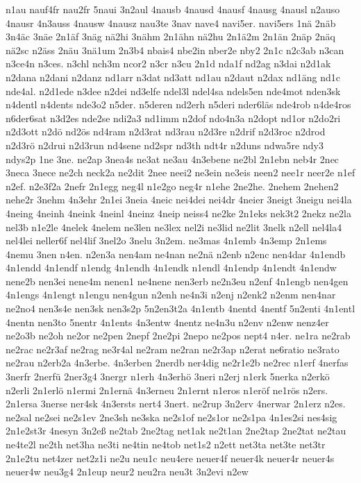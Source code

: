 {n1au
nauf4fr
nau2fr
5naui
3n2aul
4nausb
4nausd
4nausf
4nausg
4nausl
n2auso
4nausr
4n3auss
4nausw
4nausz
nau3te
3nav
nave4
navi5er.
navi5ers
1nä
2näb
3n4äc
3näe
2n1äf
3näg
nä2hi
3nähm
2n1ähn
nä2hu
2n1ä2m
2n1än
2näp
2näq
nä2sc
n2äss
2näu
3nä1um
2n3b4
nbais4
nbe2in
nber2e
nby2
2n1c
n2c3ab
n3can
n3ce4n
n3ces.
n3chl
nch3m
ncor2
n3cr
n3cu
2n1d
nda1f
nd2ag
n3dai
n2d1ak
n2dana
n2dani
n2danz
nd1arr
n3dat
nd3att
nd1au
n2daut
n2dax
nd1äng
nd1c
nde4al.
n2d1ede
n3dee
n2dei
nd3elfe
ndel3l
ndel4sa
ndels5en
nde4mot
nden3sk
n4dentl
n4dents
nde3o2
n5der.
n5deren
nd2erh
n5deri
nder6läs
nde4rob
n4de4ros
n6der6sat
n3d2es
nde2se
ndi2a3
nd1imm
n2dof
ndo4n3a
n2dopt
nd1or
n2do2ri
n2d3ott
n2dö
nd2ös
nd4ram
n2d3rat
nd3rau
n2d3re
n2drif
n2d3roc
n2drod
n2d3rö
n2drui
n2d3run
nd4sene
nd2spr
nd3th
ndt4r
n2duns
ndwa5re
ndy3
ndys2p
1ne
3ne.
ne2ap
3nea4s
ne3at
ne3au
4n3ebene
ne2bl
2n1ebn
neb4r
2nec
3neca
3nece
ne2ch
neck2a
ne2dit
2nee
neei2
ne3ein
ne3eis
neen2
nee1r
neer2e
n1ef
n2ef.
n2e3f2a
2nefr
2n1egg
neg4l
n1e2go
neg4r
n1ehe
2ne2he.
2nehem
2nehen2
nehe2r
3nehm
4n3ehr
2n1ei
3neia
4neic
nei4dei
nei4dr
4neier
3neigt
3neigu
nei4la
4neing
4neinh
4neink
4neinl
4neinz
4neip
neiss4
ne2ke
2n1eks
nek3t2
2nekz
ne2la
nel3b
n1e2le
4nelek
4nelem
ne3len
ne3lex
nel2i
ne3lid
ne2lit
3nelk
n2ell
nel4la4
nel4lei
neller6f
nel4lif
3nel2o
3nelu
3n2em.
ne3mas
4n1emb
4n3emp
2n1ems
4nemu
3nen
n4en.
n2en3a
nen4am
ne4nan
ne2nä
n2enb
n2enc
nen4dar
4n1endb
4n1endd
4n1endf
n1endg
4n1endh
4n1endk
n1endl
4n1endp
4n1endt
4n1endw
nene2b
nen3ei
nene4m
nenen1
ne4nene
nen3erb
ne2n3eu
n2enf
4n1engb
nen4gen
4n1engs
4n1engt
n1engu
nen4gun
n2enh
ne4n3i
n2enj
n2enk2
n2enm
nen4nar
ne2no4
nen3s4e
nen3sk
nen3s2p
5n2en3t2a
4n1entb
4nentd
4nentf
5n2enti
4n1entl
4nentn
nen3to
5nentr
4n1ents
4n3entw
4nentz
ne4n3u
n2env
n2enw
nenz4er
ne2o3b
ne2oh
ne2or
ne2pen
2nepf
2ne2pi
2nepo
ne2pos
nept4
n4er.
ne1ra
ne2rab
ne2rac
ne2r3af
ne2rag
ne3r4al
ne2ram
ne2ran
ne2r3ap
n2erat
ne6ratio
ne3rato
ne2rau
n2erb2a
4n3erbe.
4n3erben
2nerdb
ner4dig
ne2r1e2b
ne2rec
n1erf
4nerfas
3nerfr
2nerfü
2ner3g4
3nergr
n1erh
4n3erhö
3neri
n2erj
n1erk
5nerka
n2erkö
n2erli
2n1erlö
n1ermi
2n1ernä
4n3erneu
2n1ernt
n1eros
n1eröf
ne1rös
n2ers.
2n1ersa
3nerse
ner4sk
4n3ersts
nert4
3nert.
ne2rup
3n2erv
4nerwar
2n1erz
n2es.
ne2sal
ne2sei
ne2s1ev
2ne3sh
ne3ska
ne2s1of
ne2s1or
ne2s1pa
4n1es2si
nes4sig
2n1e2st3r
4nesyn
3n2eß
ne2tab
2ne2tag
net1ak
ne2t1an
2ne2tap
2ne2tat
ne2tau
ne4te2l
ne2th
net3ha
ne3ti
ne4tin
ne4tob
net1s2
n2ett
net3ta
net3te
net3tr
2n1e2tu
net4zer
net2z1i
ne2u
neu1c
neu4ere
neuer4f
neuer4k
neuer4r
neuer4s
neuer4w
neu3g4
2n1eup
neur2
neu2ra
neu3t
3n2evi
n2ew
}
